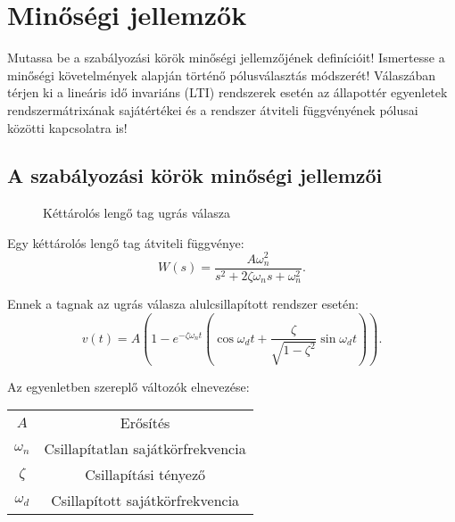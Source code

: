 \section{Minőségi jellemzők}

\begin{about}
  Mutassa be a szabályozási körök minőségi jellemzőjének definícióit! Ismertesse
  a minőségi követelmények alapján történő pólusválasztás módszerét! Válaszában
  térjen ki a lineáris idő invariáns (LTI) rendszerek esetén az állapottér
  egyenletek rendszermátrixának sajátértékei és a rendszer átviteli függvényének
  pólusai közötti kapcsolatra is!
\end{about}

\subsection{A szabályozási körök minőségi jellemzői}

\begin{figure}[htb]
  \centering
  
  \caption{Kéttárolós lengő tag ugrás válasza}
  \label{fig:step}
\end{figure}

Egy kéttárolós lengő tag átviteli függvénye:
\begin{equation}
  W(s) = \frac{A \omega_n^2}{s^2 + 2 \zeta \omega_n s + \omega_n^2}
  .
  \label{eq:W-2-ref}
\end{equation}

Ennek a tagnak az ugrás válasza alulcsillapított rendszer esetén:
\begin{equation}
  v(t) = A \left(
  1 - e^{-\zeta \omega_n t} \left(
  \cos \omega_d t
  + \frac{\zeta}{\sqrt{1 - \zeta^2}} \sin \omega_d t
  \right)
  \right)
  .
  \label{eq:W-2-ref-step}
\end{equation}

Az egyenletben szereplő változók elnevezése:
\begin{center}
  \begin{tabular}{ | c c | }
    \hline
    $A$        & {Erősítés}                          \\
    $\omega_n$ & {Csillapítatlan sajátkörfrekvencia} \\
    $\zeta$    & {Csillapítási tényező}              \\
    $\omega_d$ & {Csillapított sajátkörfrekvencia}   \\
    \hline
  \end{tabular}
\end{center}

